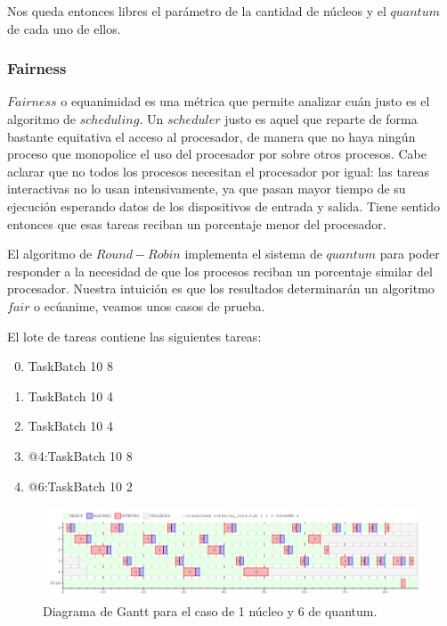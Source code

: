 Nos queda entonces libres el parámetro de la cantidad de núcleos y el $quantum$ de cada uno de ellos.


\subsubsection{Fairness}

$Fairness$ o equanimidad es una métrica que permite analizar cuán justo es el algoritmo de $scheduling$. Un $scheduler$ justo es aquel que reparte de forma bastante equitativa el acceso al procesador, de manera que no haya ningún proceso que monopolice el uso del procesador por sobre otros procesos. Cabe aclarar que no todos los procesos necesitan el procesador por igual: las tareas interactivas no lo usan intensivamente, ya que pasan mayor tiempo de su ejecución esperando datos de los dispositivos de entrada y salida. Tiene sentido entonces que esas tareas reciban un porcentaje menor del procesador.

El algoritmo de $Round-Robin$ implementa el sistema de $quantum$ para poder responder a la necesidad de que los procesos reciban un porcentaje similar del procesador. Nuestra intuición es que los resultados determinarán un algoritmo $fair$ o ecúanime, veamos unos casos de prueba.

El lote de tareas contiene las siguientes tareas:
\begin{enumerate}
	\setcounter{enumi}{-1}
	\item TaskBatch 10 8
	\item TaskBatch 10 4
	\item TaskBatch 10 4
	\item @4:TaskBatch 10 8
	\item @6:TaskBatch 10 2
\end{enumerate}

\newpage
\begin{figure}[H]
	\includegraphics[scale=0.49]{ej7/ej7_1_6.png}
	\caption{Diagrama de Gantt para el caso de 1 núcleo y 6 de quantum.}
\end{figure}

